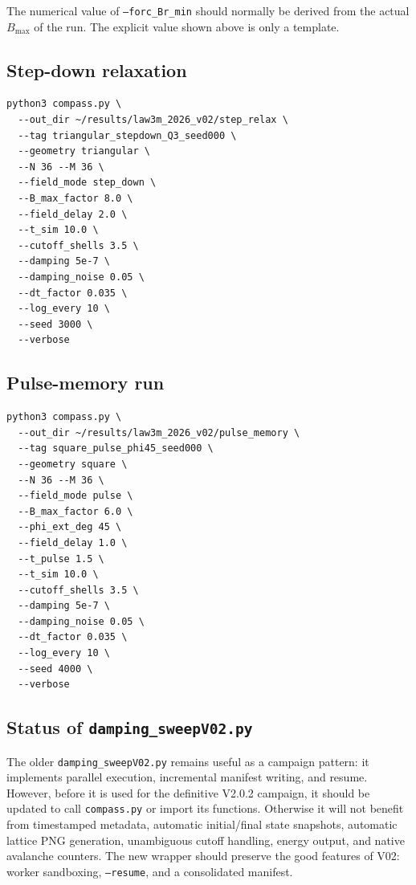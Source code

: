 \documentclass[11pt,a4paper]{article}
\newcommand{\code}[1]{\texttt{#1}}
\begin{document}
The numerical value of \code{--forc\_Br\_min} should normally be derived from the actual $B_{\max}$ of the run. The explicit value shown above is only a template.

\subsection{Step-down relaxation}

\begin{lstlisting}[style=bashstyle]
python3 compass.py \
  --out_dir ~/results/law3m_2026_v02/step_relax \
  --tag triangular_stepdown_Q3_seed000 \
  --geometry triangular \
  --N 36 --M 36 \
  --field_mode step_down \
  --B_max_factor 8.0 \
  --field_delay 2.0 \
  --t_sim 10.0 \
  --cutoff_shells 3.5 \
  --damping 5e-7 \
  --damping_noise 0.05 \
  --dt_factor 0.035 \
  --log_every 10 \
  --seed 3000 \
  --verbose
\end{lstlisting}

\subsection{Pulse-memory run}

\begin{lstlisting}[style=bashstyle]
python3 compass.py \
  --out_dir ~/results/law3m_2026_v02/pulse_memory \
  --tag square_pulse_phi45_seed000 \
  --geometry square \
  --N 36 --M 36 \
  --field_mode pulse \
  --B_max_factor 6.0 \
  --phi_ext_deg 45 \
  --field_delay 1.0 \
  --t_pulse 1.5 \
  --t_sim 10.0 \
  --cutoff_shells 3.5 \
  --damping 5e-7 \
  --damping_noise 0.05 \
  --dt_factor 0.035 \
  --log_every 10 \
  --seed 4000 \
  --verbose
\end{lstlisting}

\subsection{Status of \code{damping\_sweepV02.py}}

The older \code{damping\_sweepV02.py} remains useful as a campaign pattern: it implements parallel execution, incremental manifest writing, and resume. However, before it is used for the definitive V2.0.2 campaign, it should be updated to call \code{compass.py} or import its functions. Otherwise it will not benefit from timestamped metadata, automatic initial/final state snapshots, automatic lattice PNG generation, unambiguous cutoff handling, energy output, and native avalanche counters. The new wrapper should preserve the good features of V02: worker sandboxing, \code{--resume}, and a consolidated manifest.
\end{document}
